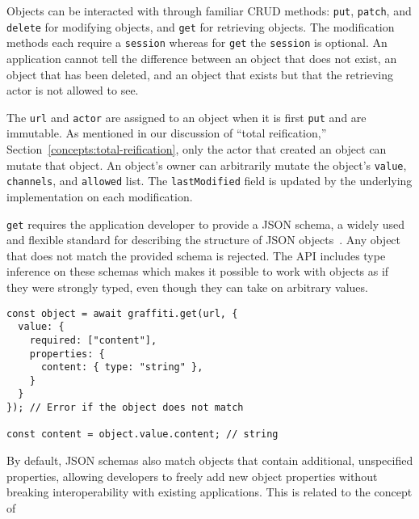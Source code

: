 Objects can be interacted with through familiar CRUD methods:
\texttt{put}, \texttt{patch}, and \texttt{delete} for modifying objects,
and \texttt{get} for retrieving objects.
The modification methods each require a \texttt{session} whereas
for \texttt{get} the \texttt{session} is optional.
An application cannot tell the difference between an object that does not exist,
an object that has been deleted, and an object that exists but that the retrieving actor
is not allowed to see.

The \texttt{url} and \texttt{actor} are assigned to an object when it is first \texttt{put}
and are immutable.
As mentioned in our discussion of ``total reification,'' Section~\ref{concepts:total-reification},
only the actor that created an object can mutate that object.
An object's owner can arbitrarily mutate the object's
\texttt{value}, \texttt{channels}, and \texttt{allowed} list.
The \texttt{lastModified} field is updated by the underlying implementation on each modification.

\texttt{get} requires the application developer to provide
a JSON schema, a widely used and flexible standard for describing
the structure of JSON objects~\cite{jsonschema}.
Any object that does not match the provided schema is rejected.
The API includes type inference on these schemas which makes it possible to work
with objects as if they were strongly typed, even though they can take on arbitrary values.

\begin{verbatim}
const object = await graffiti.get(url, {
  value: {
    required: ["content"],
    properties: {
      content: { type: "string" },
    }
  }
}); // Error if the object does not match

const content = object.value.content; // string
\end{verbatim}

By default, JSON schemas also match objects that contain additional,
unspecified properties, allowing developers to freely
add new object properties without breaking
interoperability with existing applications.
This is related to the concept of





